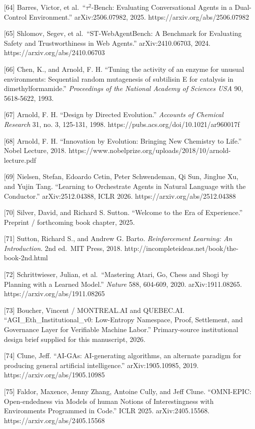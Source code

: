 \documentclass[
  11pt,
]{article}
\begin{document}
{[}64{]} Barres, Victor, et al.~``\(\tau^2\)-Bench: Evaluating
Conversational Agents in a Dual-Control Environment.'' arXiv:2506.07982,
2025. https://arxiv.org/abs/2506.07982

{[}65{]} Shlomov, Segev, et al.~``ST-WebAgentBench: A Benchmark for
Evaluating Safety and Trustworthiness in Web Agents.'' arXiv:2410.06703,
2024. https://arxiv.org/abs/2410.06703

{[}66{]} Chen, K., and Arnold, F. H. ``Tuning the activity of an enzyme
for unusual environments: Sequential random mutagenesis of subtilisin E
for catalysis in dimethylformamide.'' \emph{Proceedings of the National
Academy of Sciences USA} 90, 5618-5622, 1993.

{[}67{]} Arnold, F. H. ``Design by Directed Evolution.'' \emph{Accounts
of Chemical Research} 31, no. 3, 125-131, 1998.
https://pubs.acs.org/doi/10.1021/ar960017f

{[}68{]} Arnold, F. H. ``Innovation by Evolution: Bringing New Chemistry
to Life.'' Nobel Lecture, 2018.
https://www.nobelprize.org/uploads/2018/10/arnold-lecture.pdf

{[}69{]} Nielsen, Stefan, Edoardo Cetin, Peter Schwendeman, Qi Sun,
Jinglue Xu, and Yujin Tang. ``Learning to Orchestrate Agents in Natural
Language with the Conductor.'' arXiv:2512.04388, ICLR 2026.
https://arxiv.org/abs/2512.04388

{[}70{]} Silver, David, and Richard S. Sutton. ``Welcome to the Era of
Experience.'' Preprint / forthcoming book chapter, 2025.

{[}71{]} Sutton, Richard S., and Andrew G. Barto. \emph{Reinforcement
Learning: An Introduction}. 2nd ed.~MIT Press, 2018.
http://incompleteideas.net/book/the-book-2nd.html

{[}72{]} Schrittwieser, Julian, et al.~``Mastering Atari, Go, Chess and
Shogi by Planning with a Learned Model.'' \emph{Nature} 588, 604-609,
2020. arXiv:1911.08265. https://arxiv.org/abs/1911.08265

{[}73{]} Boucher, Vincent / MONTREAL.AI and QUEBEC.AI.
``AGI\_Eth\_Institutional\_v0: Low-Entropy Namespace, Proof, Settlement,
and Governance Layer for Verifiable Machine Labor.'' Primary-source
institutional design brief supplied for this manuscript, 2026.

{[}74{]} Clune, Jeff. ``AI-GAs: AI-generating algorithms, an alternate
paradigm for producing general artificial intelligence.''
arXiv:1905.10985, 2019. https://arxiv.org/abs/1905.10985

{[}75{]} Faldor, Maxence, Jenny Zhang, Antoine Cully, and Jeff Clune.
``OMNI-EPIC: Open-endedness via Models of human Notions of
Interestingness with Environments Programmed in Code.'' ICLR 2025.
arXiv:2405.15568. https://arxiv.org/abs/2405.15568
\end{document}

